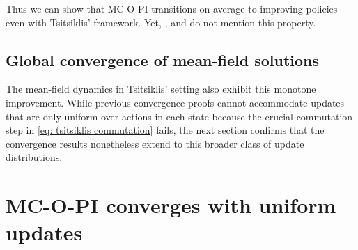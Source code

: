 \begin{remark}
Thus we can show that MC-O-PI transitions on average to improving policies even with Tsitsiklis' framework.
Yet, \citet{Tsitsiklis2002OnIteration}, \citet{Chen2018OnProblem} and \citet{Liu2021OnStarts} do not mention this property.
\end{remark}

\subsection{Global convergence of mean-field solutions}

\vspace{0.4cm}




The mean-field dynamics in Tsitsiklis' setting also exhibit this monotone improvement.
While previous convergence proofs cannot accommodate updates that are only uniform over actions in each state because the crucial commutation step in \eqref{eq: tsitsiklis commutation} fails,
the next section confirms that the convergence results nonetheless extend to this broader class of update distributions.


\section{MC-O-PI converges with uniform updates}



